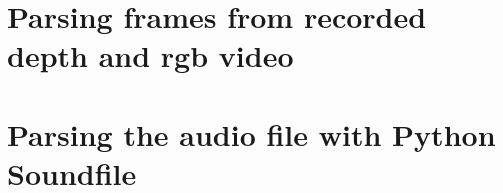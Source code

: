 \documentclass[english, numeric, fleqn]{tauthesis}
\begin{document}
\begin{appendices}
\chapter{Parsing frames from recorded depth and rgb video}
\label{app:image-parsing}


\chapter{Parsing the audio file with Python Soundfile}
\label{app:mic-parsing}


\end{appendices}

\glsaddallunused[symbols]
\end{document}
